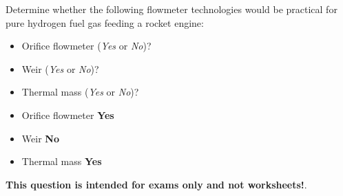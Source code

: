 

Determine whether the following flowmeter technologies would be practical for pure hydrogen fuel gas feeding a rocket engine:

\begin{itemize}
\item{} Orifice flowmeter ({\it Yes} or {\it No})?
\vskip 10pt
\item{} Weir ({\it Yes} or {\it No})?
\vskip 10pt
\item{} Thermal mass ({\it Yes} or {\it No})?
\end{itemize}







\begin{itemize}
\item{} Orifice flowmeter {\bf Yes}
\item{} Weir {\bf No}
\item{} Thermal mass {\bf Yes}
\end{itemize}







{\bf This question is intended for exams only and not worksheets!}.



